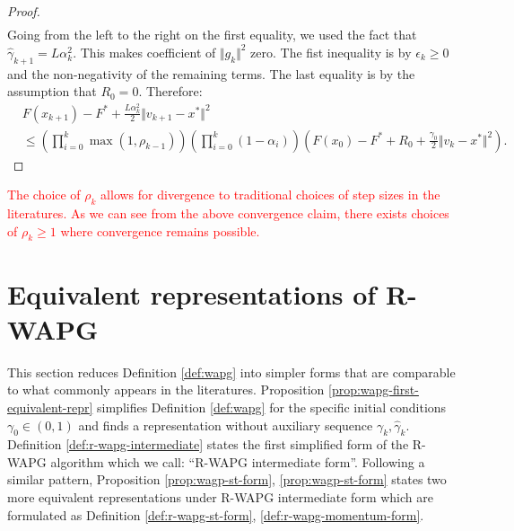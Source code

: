 \documentclass[12pt]{article}
\begin{document}
\begin{proof}
\begin{align*}
        \end{align*}
        Going from the left to the right on the first equality, we used the fact that $\hat \gamma_{k + 1} = L \alpha_{k}^2$.
        This makes coefficient of $\Vert g_k\Vert^2$ zero. 
        The fist inequality is by $\epsilon_k \ge 0$ and the non-negativity of the remaining terms. 
        The last equality is by the assumption that $R_0 = 0$. 
        Therefore: 
        {\small
        \begin{align*}
            & F(x_{k + 1}) - F^* +
            \frac{L\alpha_k^2}{2}\Vert v_{k + 1} - x^*\Vert^2
            \\
            &\le 
            \left(
                \prod_{i = 0}^{k} \max(1, \rho_{k - 1})
            \right)
            \left(
                \prod_{i = 0}^{k} \left(1  - \alpha_i\right)
            \right)
            \left(
                F(x_0) - F^* + R_0 + \frac{\gamma_0}{2}\Vert v_k - x^*\Vert^2
            \right). 
        \end{align*}
        }
    \end{proof}
    \begin{remark}        
        \textcolor{red}
        {
            The choice of $\rho_k$ allows for divergence to traditional choices of step sizes in the literatures. 
            As we can see from the above convergence claim, there exists choices of $\rho_k\ge 1$ where convergence remains possible. 
        }
    \end{remark}


\section{Equivalent representations of R-WAPG}
    This section reduces Definition \ref{def:wapg} into simpler forms that are comparable to what commonly appears in the literatures. 
    Proposition \ref{prop:wapg-first-equivalent-repr} simplifies Definition \ref{def:wapg} for the specific initial conditions $\gamma_0 \in(0, 1)$ and finds a representation without auxiliary sequence $\gamma_k, \hat \gamma_k$. 
    Definition \ref{def:r-wapg-intermediate} states the first simplified form of the R-WAPG algorithm which we call: ``R-WAPG intermediate form''. 
    Following a similar pattern, Proposition \ref{prop:wagp-st-form}, \ref{prop:wagp-st-form} states two more equivalent representations under R-WAPG intermediate form which are formulated as Definition \ref{def:r-wapg-st-form}, \ref{def:r-wapg-momentum-form}. 
    
\end{document}

